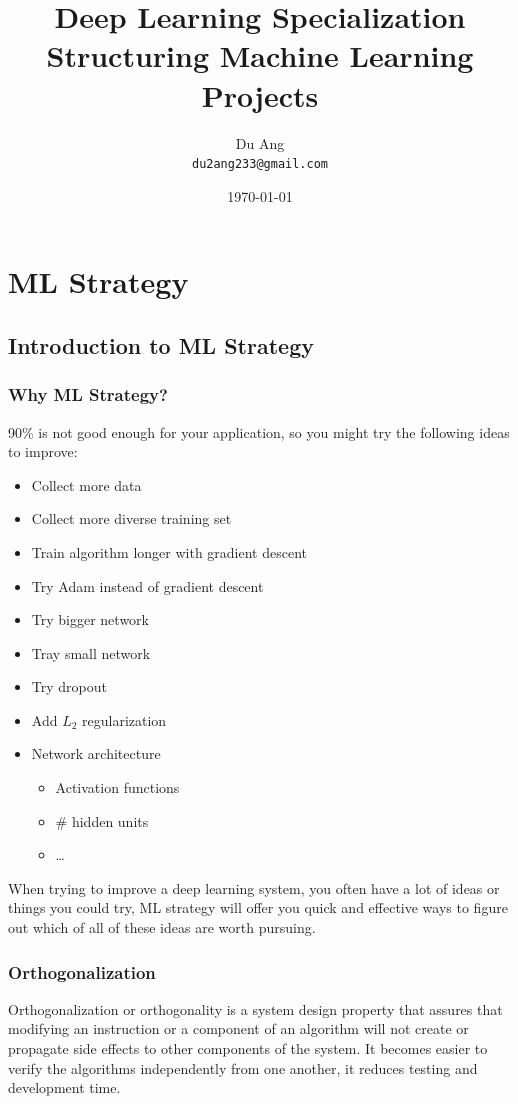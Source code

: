 \documentclass[UTF8]{article}
\title{Deep Learning Specialization \\
        Structuring Machine Learning Projects}
\author{Du Ang \\ \texttt{du2ang233@gmail.com} }
\date{\today}
\begin{document}
\maketitle

\tableofcontents
\newpage

\section{ML Strategy}
\subsection{Introduction to ML Strategy}
\subsubsection{Why ML Strategy?}
90\% is not good enough for your application, so you might try the following ideas to improve:
\begin{itemize}
    \item Collect more data
    \item Collect more diverse training set
    \item Train algorithm longer with gradient descent
    \item Try Adam instead of gradient descent
    \item Try bigger network
    \item Tray small network
    \item Try dropout
    \item Add $L_2$ regularization
    \item Network architecture
    \begin{itemize}
        \item Activation functions
        \item \# hidden units
        \item \ldots
    \end{itemize}
\end{itemize}

When trying to improve a deep learning system, you often have a lot of ideas or things you could
try, ML strategy will offer you quick and effective ways to figure out which of all of these ideas
are worth pursuing.

\subsubsection{Orthogonalization}
Orthogonalization or orthogonality is a system design property that assures that modifying an
instruction or a component of an algorithm will not create or propagate side effects to other
components of the system. It becomes easier to verify the algorithms independently from one another,
it reduces testing and development time.
\end{document}
